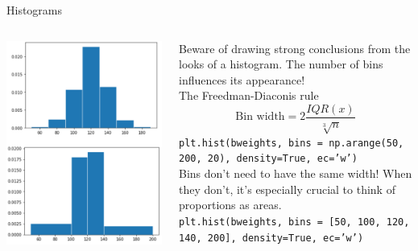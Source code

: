 \documentclass[aspectratio=169]{../latex_main/tntbeamer}  %
\begin{document}
    
    \begin{frame}{Histograms}
        \vspace{-2em}
        \begin{columns}
        
            \begin{column}{.4\textwidth}
            
                      \centering
                      \includegraphics[scale=.35]{Bild31}

            \end{column}
            
            
            \begin{column}{.6\textwidth}
            
                  Beware of drawing strong conclusions from the looks of a histogram. The number of bins influences its appearance!\\
                  The Freedman-Diaconis rule
                  \begin{equation*}
                      \text{Bin width} = 2\dfrac{IQR(x)}{\sqrt[3]{n}}
                  \end{equation*}
                \texttt{plt.hist(bweights, bins = np.arange(50, 200, 20), density=True, ec='w')}\\
                \bigskip
                Bins don’t need to have the same width! When they don’t, it’s especially crucial to think of proportions as areas.\\
                \bigskip
                \texttt{plt.hist(bweights, bins = [50, 100, 120, 140, 200], density=True, ec='w')}


\end{column}
\end{columns}
\end{frame}
\end{document}

